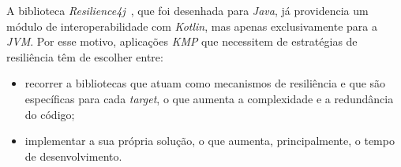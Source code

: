 A biblioteca \textit{Resilience4j}~\cite{resilience4j}, que foi desenhada para \textit{Java}, já providencia um módulo de interoperabilidade com \textit{Kotlin}, mas apenas exclusivamente para a \textit{JVM}.
Por esse motivo, aplicações \textit{KMP} que necessitem de estratégias de resiliência têm de escolher entre:

\begin{itemize}[topsep=0pt,itemsep=0pt,partopsep=0pt, parsep=0pt]
    \item recorrer a bibliotecas que atuam como mecanismos de resiliência e que são específicas para cada \textit{target}, o que aumenta a complexidade e a redundância do código;
    \item implementar a sua própria solução, o que aumenta, principalmente, o tempo de desenvolvimento.
\end{itemize}
